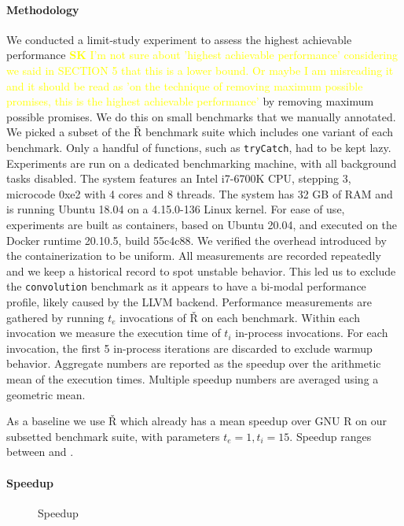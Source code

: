 \documentclass[review,creen,acmsmall]{acmart}
\newcommand{\authorcomment}[3]{\xspace\textcolor{#1}{{\bf #2} #3}\xspace}
\newcommand{\SK}[1]{\authorcomment{yellow}{SK}{#1}}
\renewcommand{\Rsh}{{\sf\v R}\xspace}
\begin{document}
\paragraph{Methodology}
We conducted a limit-study experiment to assess the highest achievable performance 
\SK{I'm not sure about 'highest achievable performance' considering we said in 
SECTION 5 that this is a lower bound. Or maybe I am misreading it
and it should be read as 'on the technique of removing maximum possible promises, 
this is the highest achievable performance'}
by removing maximum possible promises. We do this on small benchmarks that we
manually annotated. We picked a subset of the \Rsh benchmark suite which
includes one variant of each benchmark. Only a handful of functions, such as
\lstinline{tryCatch}, had to be kept lazy. Experiments are run on a dedicated
benchmarking machine, with all background tasks disabled. The system features an
Intel i7-6700K CPU, stepping 3, microcode 0xe2 with 4 cores and 8 threads. The
system has 32 GB of RAM and is running Ubuntu 18.04 on a 4.15.0-136 Linux
kernel. For ease of use, experiments are built as containers, based on Ubuntu
20.04, and executed on the Docker runtime 20.10.5, build 55c4c88. We verified
the overhead introduced by the containerization to be uniform. All measurements
are recorded repeatedly and we keep a historical record to spot unstable
behavior. This led us to exclude the \lstinline{convolution} benchmark as it
appears to have a bi-modal performance profile, likely caused by the LLVM
backend.
Performance measurements are gathered by running $t_e$ invocations of \Rsh on
each benchmark. Within each invocation we measure the execution time of $t_i$
in-process invocations. For each invocation, the first 5 in-process iterations
are discarded to exclude warmup behavior. Aggregate numbers are reported as the
speedup over the arithmetic mean of the execution times. Multiple speedup
numbers are averaged using a geometric mean. 

As a baseline we use \Rsh which already has a \speedupRsh mean speedup over GNU R
 on our subsetted benchmark suite, with parameters $t_e = 1, t_i = 15$. Speedup
 ranges between \speedupRshMin and \speedupRshMax. 

\paragraph{Speedup}

\begin{figure}[h]
  \centering 
  \caption{Speedup} \label{fig:speedup}
\end{figure}
\end{document}

